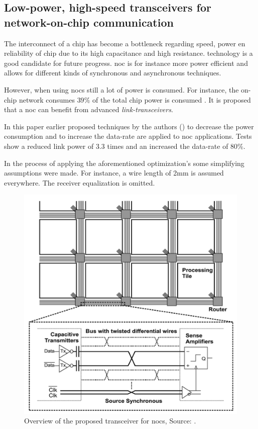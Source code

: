 \subsection{Low-power, high-speed transceivers for network-on-chip
communication \cite{schinkel2009low}} \label{ss:schinkel2009low}
The interconnect of a chip has become a bottleneck regarding speed, power en reliability of chip due to its high capacitance and high resistance.  technology is a good candidate for future progress.
\ac{noc} is for instance more power efficient and allows for different kinds of synchronous and asynchronous techniques.


\motive
However, when using \acsp{noc} still a lot of power is consumed.
For instance, the on-chip network consumes $39\%$ of the total chip power is consumed \cite{vangal20075}.
It is proposed that a \ac{noc} can benefit from advanced \textit{link-transceivers}.

\objective
In this paper earlier proposed techniques by the authors (\cite{mensink20070}) to decrease the power consumption and to increase the data-rate are applied to \ac{noc} applications.
Tests show a reduced link power of 3.3 times and an increased the data-rate of 80\%.

\summary
In the process of applying the aforementioned optimization's some simplifying assumptions were made. 
For instance, a wire length of 2mm is assumed everywhere. 
The receiver equalization is omitted.

\begin{figure}[]
	\centering
	\includegraphics[width=0.78\linewidth]{Figures/Rep2Overview.png}
	\caption{Overview of the proposed transceiver for \acsp{noc}, Source: \cite{schinkel2009low}.} 
    \label{fig:rep2:overview}
\end{figure}

